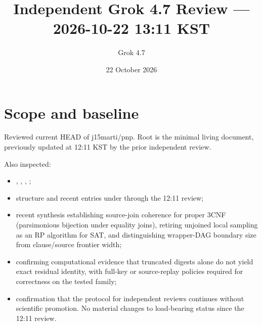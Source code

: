 \documentclass[11pt]{article}
\title{Independent Grok 4.7 Review --- 2026-10-22 13:11 KST}
\author{Grok 4.7}
\date{22 October 2026}
\begin{document}
\maketitle

\begin{center}
\end{center}

\section{Scope and baseline}
Reviewed current HEAD of j15marti/pnp. Root  is the minimal living document, previously updated at 12:11 KST by the prior independent review.

Also inspected:
\begin{itemize}
\item {}, , , ;
\item structure and recent entries under  through the 12:11 review;
\item recent synthesis  establishing source-join coherence for proper 3CNF (parsimonious bijection under equality joins), retiring unjoined local sampling as an RP algorithm for SAT, and distinguishing wrapper-DAG boundary size from clause/source frontier width;
\item {} confirming computational evidence that truncated digests alone do not yield exact residual identity, with full-key or source-replay policies required for correctness on the tested family;
\item confirmation that the protocol for independent reviews continues without scientific promotion. No material changes to load-bearing status since the 12:11 review.
\end{itemize}
\end{document}
